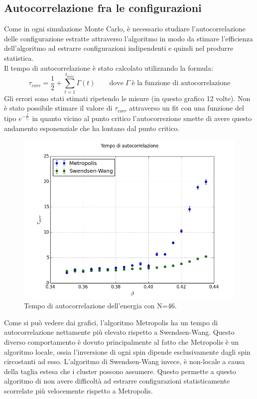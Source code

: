 \subsection{Autocorrelazione fra le configurazioni}
Come in ogni simulazione Monte Carlo, è necessario studiare l'autocorrelazione delle configurazione estratte attraverso l'algoritmo in modo da stimare l'efficienza dell'algoritmo ad estrarre configurazioni
indipendenti e quindi nel produrre statistica.\\
Il tempo di autocorrelazione è stato calcolato utilizzando la formula:
$$
	\tau_{corr} = \frac{1}{2} + \sum_{t=1}^{t_{max}} \Gamma(t) \qquad \mbox{dove} \; \Gamma \; \mbox{è la funzione di autocorrelazione}
$$
Gli errori sono stati stimati ripetendo le misure (in questo grafico 12 volte).
Non è stato possibile stimare il valore di $\tau_{corr}$ attraverso un fit con una funzione del tipo $e^{-\frac{t}{\tau_{c}}}$ in quanto vicino al punto critico l'autocorrezione smette di avere questo andamento esponenziale che ha lontano dal punto critico.
\begin{figure}[h]
\includegraphics[scale=0.6]{compare.png}
\caption{Tempo di autocorrelazione dell'energia con N=46.}
\end{figure}
Come si può vedere dai grafici, l'algoritmo Metropolis ha un tempo di autocorrelazione nettamente più elevato rispetto a Swendsen-Wang. Questo diverso comportamento è dovuto principalmente al fatto che Metropolis è un algoritmo locale, ossia l'inversione di ogni spin dipende esclusivamente dagli spin circostanti ad esso. L'algoritmo di Swendsen-Wang invece, è non-locale a causa della taglia estesa  che i cluster possono assumere.
Questo permette a questo algoritmo di non avere difficoltà ad estrarre configurazioni statisticamente scorrelate più velocemente rispetto a Metropolis.

